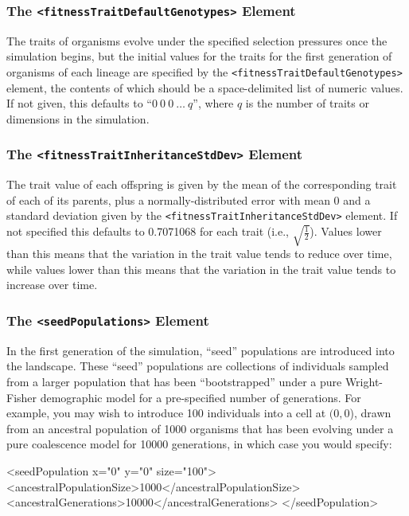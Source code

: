 \documentclass[11pt]{article}
\newcommand{\xmlelem}[1]{{\tt<\textcolor{xmlelem}{#1}>}}
\begin{document}
\subsubsection{The \xmlelem{fitnessTraitDefaultGenotypes} Element}

The traits of organisms evolve under the specified selection pressures once the simulation begins, but the initial values for the traits for the first generation of organisms of each lineage are specified by the \xmlelem{fitnessTraitDefaultGenotypes} element, the contents of which should be a space-delimited list of numeric values.
If not given, this defaults to ``$0 \ 0 \ 0 \ \dots \ q$'', where $q$ is the number of traits or dimensions in the simulation.

\subsubsection{The \xmlelem{fitnessTraitInheritanceStdDev} Element}

The trait value of each offspring is given by the mean of the corresponding trait of each of its parents, plus a normally-distributed error with mean 0 and a standard deviation given by the \xmlelem{fitnessTraitInheritanceStdDev} element.
If not specified this defaults to 0.7071068 for each trait (i.e., $\sqrt{\frac{1}{2}}$).
Values lower than this means that the variation in the trait value tends to reduce over time, while values lower than this means that the variation in the trait value tends to increase over time.

\subsubsection{The \xmlelem{seedPopulations} Element}

In the first generation of the simulation, ``seed'' populations are introduced into the landscape.
These ``seed'' populations are collections of individuals sampled from a larger population that has been ``bootstrapped'' under a pure Wright-Fisher demographic model for a pre-specified number of generations.
For example, you may wish to introduce 100 individuals into a cell at $(0,0$), drawn from an ancestral population of 1000 organisms that has been evolving under a pure coalescence model for 10000 generations, in which case you would specify:

\begin{ginkgoxml}
<seedPopulation x="0" y="0" size="100">
	<ancestralPopulationSize>1000</ancestralPopulationSize>
	<ancestralGenerations>10000</ancestralGenerations>
</seedPopulation>
\end{ginkgoxml}
\end{document}
